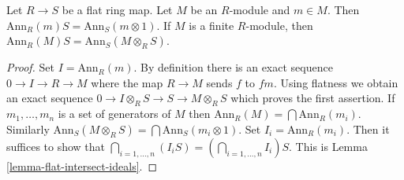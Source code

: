 \begin{lemma}
\label{lemma-annihilator-flat-base-change}
Let $R \to S$ be a flat ring map. Let $M$ be an $R$-module and
$m \in M$. Then $\text{Ann}_R(m) S = \text{Ann}_S(m \otimes 1)$.
If $M$ is a finite $R$-module, then
$\text{Ann}_R(M) S = \text{Ann}_S(M \otimes_R S)$.
\end{lemma}

\begin{proof}
Set $I = \text{Ann}_R(m)$. By definition there is an exact sequence
$0 \to I \to R \to M$ where the map $R \to M$ sends $f$ to $fm$. Using
flatness we obtain an exact sequence
$0 \to I \otimes_R S \to S \to M \otimes_R S$ which proves the first
assertion. If $m_1, \ldots, m_n$ is a set of generators of $M$
then $\text{Ann}_R(M) = \bigcap \text{Ann}_R(m_i)$. Similarly
$\text{Ann}_S(M \otimes_R S) = \bigcap \text{Ann}_S(m_i \otimes 1)$.
Set $I_i = \text{Ann}_R(m_i)$. Then it suffices to show that
$\bigcap_{i = 1, \ldots, n} (I_i S) = (\bigcap_{i = 1, \ldots, n} I_i)S$.
This is Lemma \ref{lemma-flat-intersect-ideals}.
\end{proof}